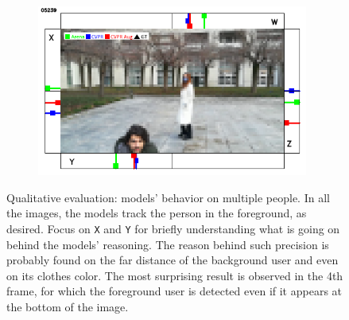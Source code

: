 \begin{figure}[H]
\begin{center}
\begin{subfigure}[h]{0.49\textwidth}
		\end{subfigure}
		\hfill
		\begin{subfigure}[h]{0.49\textwidth}
			\centering
			\includegraphics[width=0.98\textwidth]{"contents/images/qualitative-videos/double4-square02-5239"}
		\end{subfigure}
	\end{center}
	\vspace{-0.5cm}
	\caption[Qualitative evaluation: models' behavior on multiple people]{Qualitative evaluation: models' behavior on multiple people. In all the images, the models track the person in the foreground, as desired. Focus on \texttt{X} and \texttt{Y} for briefly understanding what is going on behind the models' reasoning. The reason behind such precision is probably found on the far distance of the background user and even on its clothes color. The most surprising result is observed in the 4th frame, for which the foreground user is detected even if it appears at the bottom of the image.}
	\label{fig:ql-sim-double-foreground}
\end{figure}

